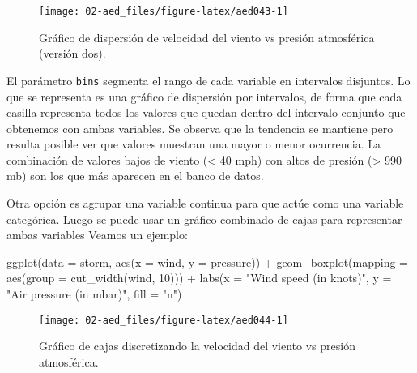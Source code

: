 \documentclass[
]{book}
\newenvironment{Shaded}{\begin{snugshade}}{\end{snugshade}}
\newcommand{\AttributeTok}[1]{\textcolor[rgb]{0.77,0.63,0.00}{#1}}
\newcommand{\DecValTok}[1]{\textcolor[rgb]{0.00,0.00,0.81}{#1}}
\newcommand{\FunctionTok}[1]{\textcolor[rgb]{0.00,0.00,0.00}{#1}}
\newcommand{\NormalTok}[1]{#1}
\newcommand{\SpecialCharTok}[1]{\textcolor[rgb]{0.00,0.00,0.00}{#1}}
\newcommand{\StringTok}[1]{\textcolor[rgb]{0.31,0.60,0.02}{#1}}
\begin{document}
\begin{figure}

{\centering \texttt{[image: 02-aed\_files/figure-latex/aed043-1]} 

}

\caption{Gráfico de dispersión de velocidad del viento vs presión atmosférica (versión dos).}\label{fig:aed043}
\end{figure}

El parámetro \texttt{bins} segmenta el rango de cada variable en intervalos disjuntos. Lo que se representa es una gráfico de dispersión por intervalos, de forma que cada casilla representa todos los valores que quedan dentro del intervalo conjunto que obtenemos con ambas variables. Se observa que la tendencia se mantiene pero resulta posible ver que valores muestran una mayor o menor ocurrencia. La combinación de valores bajos de viento (\textless{} 40 mph) con altos de presión (\textgreater{} 990 mb) son los que más aparecen en el banco de datos.

Otra opción es agrupar una variable continua para que actúe como una variable categórica. Luego se puede usar un gráfico combinado de cajas para representar ambas variables Veamos un ejemplo:

\begin{Shaded}
\begin{Highlighting}[]
\FunctionTok{ggplot}\NormalTok{(}\AttributeTok{data =}\NormalTok{ storm, }\FunctionTok{aes}\NormalTok{(}\AttributeTok{x =}\NormalTok{ wind, }\AttributeTok{y =}\NormalTok{ pressure)) }\SpecialCharTok{+} 
  \FunctionTok{geom\_boxplot}\NormalTok{(}\AttributeTok{mapping =} \FunctionTok{aes}\NormalTok{(}\AttributeTok{group =} \FunctionTok{cut\_width}\NormalTok{(wind, }\DecValTok{10}\NormalTok{))) }\SpecialCharTok{+} 
        \FunctionTok{labs}\NormalTok{(}\AttributeTok{x =} \StringTok{"Wind speed (in knots)"}\NormalTok{, }\AttributeTok{y =} \StringTok{"Air pressure (in mbar)"}\NormalTok{, }\AttributeTok{fill =} \StringTok{"n"}\NormalTok{)}
\end{Highlighting}
\end{Shaded}

\begin{figure}

{\centering \texttt{[image: 02-aed\_files/figure-latex/aed044-1]} 

}

\caption{Gráfico de cajas discretizando la velocidad del viento vs presión atmosférica.}\label{fig:aed044}
\end{figure}
\end{document}
